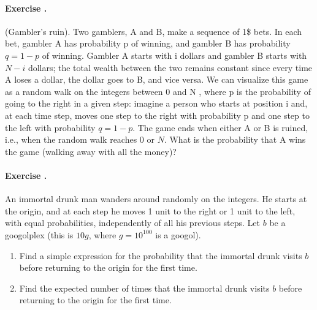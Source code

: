 \documentclass[twocolumn,12pt,a4paper]{article}
\newcounter{num}  %
\begin{document}
\paragraph{Exercise \thenum.}
(Gambler's ruin). Two gamblers, A and B, make a sequence of
1\$ bets. In each bet, gambler A has probability p of winning, and gambler B has probability $q = 1 - p$ of winning. Gambler A starts with i dollars and gambler B starts with $N - i$ dollars; the total wealth between the two remains constant since every time A loses a dollar, the dollar goes to B, and vice versa.
We can visualize this game as a random walk on the integers between 0 and N , where p is the probability of going to the right in a given step: imagine a person who starts at position i and, at each time step, moves one step to the right with probability p and one step to the left with probability $q = 1 - p$. 
The game ends when either A or B is ruined, i.e., when the random walk reaches 0 or $N$. 
What is the probability that A wins the game (walking away with all the money)?


\paragraph{Exercise \thenum.}
An immortal drunk man wanders around randomly on the integers. 
He starts at the origin, and at each step he moves 1 unit to the right or 1 unit to the left, with equal probabilities, independently of all
his previous steps. 
Let $b$ be a googolplex (this is $10g$, where $g = 10^{100}$ is a googol).
\begin{enumerate}
	\item Find a simple expression for the probability that the immortal drunk visits $b$ before returning to the origin for the first time.
	\item Find the expected number of times that the immortal drunk visits $b$ before returning to the origin for the first time.
\end{enumerate}
\end{document}
